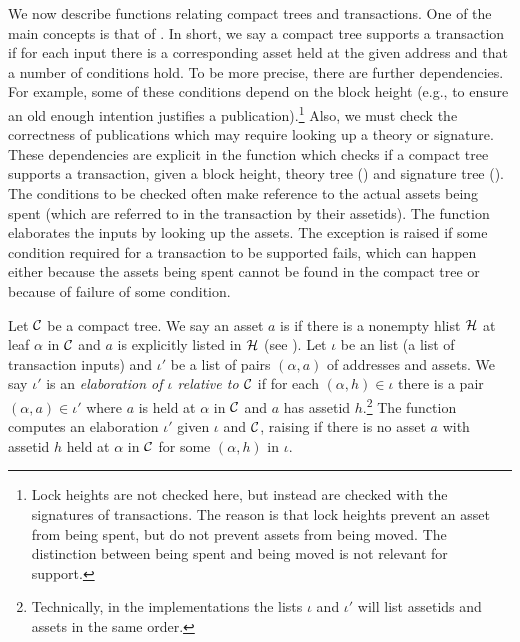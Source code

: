 We now describe functions relating compact trees and transactions.
One of the main concepts is that of {}.
In short, we say a compact tree supports a transaction if for each
input there is a corresponding asset held at the given address
and that a number of conditions hold.
To be more precise, there are further dependencies.
For example, some of these conditions depend on the block height
(e.g., to ensure an old enough intention justifies a publication).\footnote{Lock heights are not checked here, but instead are checked with the signatures of transactions. The reason is that lock heights prevent an asset from being spent, but do not prevent assets from being moved. The distinction between being spent and being moved is not relevant for support.}
Also, we must check the correctness of publications
which may require looking up a theory or signature.
These dependencies
are explicit in the function {}
which checks if a compact tree supports a transaction,
given a block height, theory tree ({}) and signature tree ({}).
The conditions to be checked often make reference to the actual assets
being spent (which are referred to in the transaction by their assetids).
The function {} elaborates
the inputs by looking up the assets.
The exception {} is raised if
some condition required for a transaction to be supported fails,
which can happen either because the assets being spent cannot be found
in the compact tree or because of failure of some condition.

Let $\mathcal{C}$ be a compact tree.
We say an asset $a$ is {}
if there is a nonempty hlist $\mathcal{H}$ at leaf $\alpha$ in $\mathcal{C}$ and $a$
is explicitly listed in $\mathcal{H}$ (see {}).
Let $\iota$ be an {} list (a list of transaction inputs)
and $\iota'$ be a list of pairs $(\alpha,a)$ of addresses and assets.
We say $\iota'$ is an {\emph{elaboration of $\iota$ relative to $\mathcal{C}$}}
if for each $(\alpha,h) \in\iota$ there is a pair $(\alpha,a) \in\iota'$
where $a$ is held at $\alpha$ in $\mathcal{C}$ and $a$ has assetid $h$.\footnote{Technically, in the implementations the lists $\iota$ and $\iota'$ will list assetids and assets in the same order.}
The function {} 
computes an elaboration $\iota'$ given $\iota$ and $\mathcal{C}$,
raising {} if 
there is no asset $a$ with assetid $h$ held at $\alpha$ in $\mathcal{C}$
for some $(\alpha,h)$ in $\iota$.

